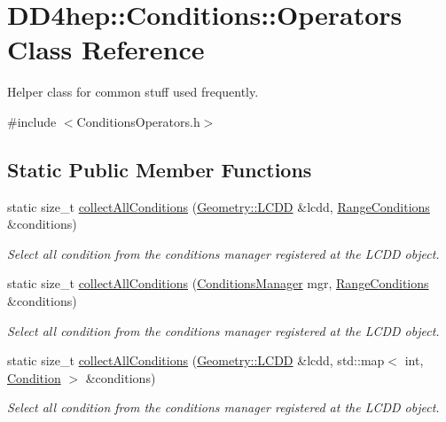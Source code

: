 \hypertarget{class_d_d4hep_1_1_conditions_1_1_operators}{
\section{DD4hep::Conditions::Operators Class Reference}
\label{class_d_d4hep_1_1_conditions_1_1_operators}
}


Helper class for common stuff used frequently.  


{\ttfamily \#include $<$ConditionsOperators.h$>$}\subsection*{Static Public Member Functions}
\begin{DoxyCompactItemize}
\item 
static size\_\-t \hyperlink{class_d_d4hep_1_1_conditions_1_1_operators_a68d6967f27827cfb1fd149228c927c93}{collectAllConditions} (\hyperlink{class_d_d4hep_1_1_geometry_1_1_l_c_d_d}{Geometry::LCDD} \&lcdd, \hyperlink{namespace_d_d4hep_1_1_conditions_ae765f0140a33973a430280f02b6062f4}{RangeConditions} \&conditions)
\begin{DoxyCompactList}\small\item\em Select all condition from the conditions manager registered at the LCDD object. \item\end{DoxyCompactList}\item 
static size\_\-t \hyperlink{class_d_d4hep_1_1_conditions_1_1_operators_a1561bd3845f72fcd583a7bfdc746649c}{collectAllConditions} (\hyperlink{class_d_d4hep_1_1_conditions_1_1_conditions_manager}{ConditionsManager} mgr, \hyperlink{namespace_d_d4hep_1_1_conditions_ae765f0140a33973a430280f02b6062f4}{RangeConditions} \&conditions)
\begin{DoxyCompactList}\small\item\em Select all condition from the conditions manager registered at the LCDD object. \item\end{DoxyCompactList}\item 
static size\_\-t \hyperlink{class_d_d4hep_1_1_conditions_1_1_operators_aaa5374db4d1a9fd0aab1868a95d10672}{collectAllConditions} (\hyperlink{class_d_d4hep_1_1_geometry_1_1_l_c_d_d}{Geometry::LCDD} \&lcdd, std::map$<$ int, \hyperlink{class_d_d4hep_1_1_conditions_1_1_condition}{Condition} $>$ \&conditions)
\begin{DoxyCompactList}\small\item\em Select all condition from the conditions manager registered at the LCDD object. \item\end{DoxyCompactList}\item 

\end{DoxyCompactItemize}
